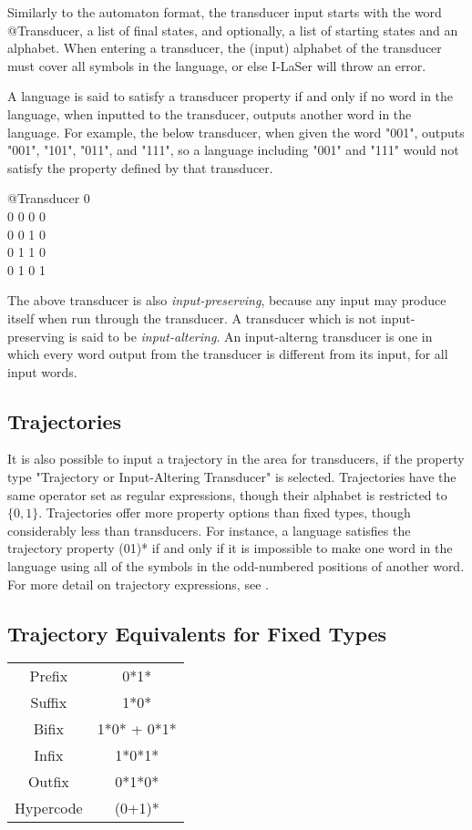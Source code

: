 \documentclass{article}
\begin{document}
Similarly to the automaton format, the transducer input starts with the word @Transducer, a list of final states, and optionally, a list of starting states and an alphabet.
When entering a transducer, the (input) alphabet of the transducer must cover all symbols in the language, or else I-LaSer will throw an error.

A language is said to satisfy a transducer property if and only if no word in the language, when inputted to the transducer, outputs another word in the language.
For example, the below transducer, when given the word "001", outputs "001", "101", "011", and "111", so a language including "001" and "111" would not satisfy the property defined by that transducer.
\begin{center}
@Transducer 0\\
0 0 0 0\\
0 0 1 0\\
0 1 1 0\\
0 1 0 1\\
\end{center}
The above transducer is also \textit{input-preserving}, because any input may produce itself when run through the transducer.
A transducer which is not input-preserving is said to be \textit{input-altering}. An input-alterng transducer is one in which every word output from the transducer is different from its input, for all input words.

\subsection{Trajectories}
It is also possible to input a trajectory in the area for transducers, if the property type "Trajectory or Input-Altering Transducer" is selected.
Trajectories have the same operator set as regular expressions, %
though their alphabet is restricted to $\{0, 1\}$.
Trajectories offer more property options than fixed types, though considerably less than transducers.
For instance, a language satisfies the trajectory property (01)* if and only if it is impossible to make one word in the language using all of the symbols in the odd-numbered positions of another word.
For more detail on trajectory expressions, see \cite{traj}.

\subsection{Trajectory Equivalents for Fixed Types}
\begin{center}
\begin{tabular}{c c}
Prefix & 0*1*\\
Suffix & 1*0*\\
Bifix & 1*0* + 0*1*\\
Infix & 1*0*1*\\
Outfix & 0*1*0*\\
Hypercode & (0+1)*
\end{tabular}
\end{center}
\end{document}
